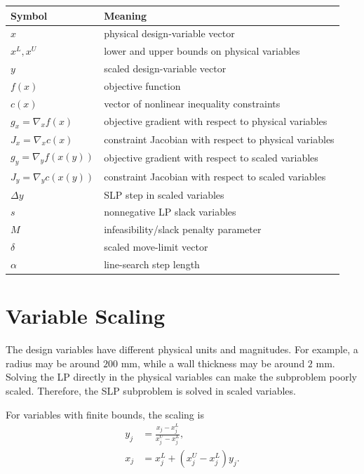 \documentclass[11pt,a4paper]{article}
\begin{document}
\begin{table}[h]
\centering
\begin{tabular}{ll}
\toprule
Symbol & Meaning \\
\midrule
\(x\) & physical design-variable vector \\
\(x^L, x^U\) & lower and upper bounds on physical variables \\
\(y\) & scaled design-variable vector \\
\(f(x)\) & objective function \\
\(c(x)\) & vector of nonlinear inequality constraints \\
\(g_x = \nabla_x f(x)\) & objective gradient with respect to physical variables \\
\(J_x = \nabla_x c(x)\) & constraint Jacobian with respect to physical variables \\
\(g_y = \nabla_y f(x(y))\) & objective gradient with respect to scaled variables \\
\(J_y = \nabla_y c(x(y))\) & constraint Jacobian with respect to scaled variables \\
\(\Delta y\) & SLP step in scaled variables \\
\(s\) & nonnegative LP slack variables \\
\(M\) & infeasibility/slack penalty parameter \\
\(\delta\) & scaled move-limit vector \\
\(\alpha\) & line-search step length \\
\bottomrule
\end{tabular}
\end{table}

\section{Variable Scaling}

The design variables have different physical units and magnitudes. For example,
a radius may be around \(200\) mm, while a wall thickness may be around \(2\) mm.
Solving the LP directly in the physical variables can make the subproblem poorly
scaled. Therefore, the SLP subproblem is solved in scaled variables.

For variables with finite bounds, the scaling is
\begin{align}
    y_j &= \frac{x_j - x^L_j}{x^U_j - x^L_j}, \\
    x_j &= x^L_j + (x^U_j - x^L_j)y_j.
\end{align}
\end{document}
